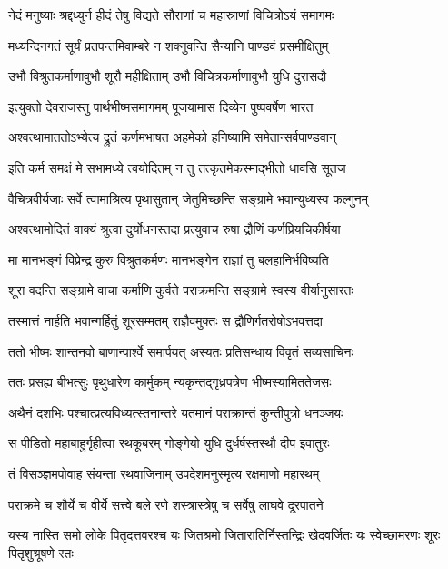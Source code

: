 \twolineshloka
{नेदं मनुष्याः श्रद्दध्युर्न हीदं तेषु विद्यते}
{सौराणां च महास्राणां विचित्रोऽयं समागमः}


\twolineshloka
{मध्यन्दिनगतं सूर्यं प्रतपन्तमिवाम्बरे}
{न शक्नुवन्ति सैन्यानि पाण्डवं प्रसमीक्षितुम्}


\twolineshloka
{उभौ विश्रुतकर्माणावुभौ शूरौ महीक्षिताम्}
{उभौ विचित्रकर्माणावुभौ युधि दुरासदौ}


\twolineshloka
{इत्युक्तो देवराजस्तु पार्थभीष्मसमागमम्}
{पूजयामास दिव्येन पुष्पवर्षेण भारत}


\twolineshloka
{अश्वत्थामाततोऽभ्येत्य द्रुतं कर्णमभाषत}
{अहमेको हनिष्यामि समेतान्सर्वपाण्डवान्}


\twolineshloka
{इति कर्म समक्षं मे सभामध्ये त्वयोदितम्}
{न तु तत्कृतमेकस्माद्भीतो धावसि सूतज}


\twolineshloka
{वैचित्रवीर्यजाः सर्वे त्वामाश्रित्य पृथासुतान्}
{जेतुमिच्छन्ति सङ्ग्रामे भवान्युध्यस्व फल्गुनम्}


\twolineshloka
{अश्वत्थामोदितं वाक्यं श्रुत्वा दुर्योधनस्तदा}
{प्रत्युवाच रुषा द्रौणिं कर्णप्रियचिकीर्षया}


\twolineshloka
{मा मानभङ्गं विप्रेन्द्र कुरु विश्रुतकर्मणः}
{मानभङ्गेन राज्ञां तु बलहानिर्भविष्यति}


\twolineshloka
{शूरा वदन्ति सङ्ग्रामे वाचा कर्माणि कुर्वते}
{पराक्रमन्ति सङ्ग्रामे स्वस्य वीर्यानुसारतः}


\twolineshloka
{तस्मात्तं नार्हति भवान्गर्हितुं शूरसम्मतम्}
{राज्ञैवमुक्तः स द्रौणिर्गतरोषोऽभवत्तदा}


\twolineshloka
{ततो भीष्मः शान्तनवो बाणान्पार्श्वे समार्पयत्}
{अस्यतः प्रतिसन्धाय विवृतं सव्यसाचिनः}


\twolineshloka
{ततः प्रसह्य बीभत्सुः पृथुधारेण कार्मुकम्}
{न्यकृन्तद्गृध्रपत्रेण भीष्मस्यामिततेजसः}


\twolineshloka
{अथैनं दशभिः पश्चात्प्रत्यविध्यत्स्तनान्तरे}
{यतमानं पराक्रान्तं कुन्तीपुत्रो धनञ्जयः}


\twolineshloka
{स पीडितो महाबाहुर्गृहीत्वा रथकूबरम्}
{गोङ्गेयो युधि दुर्धर्षस्तस्थौ दीप इवातुरः}


\twolineshloka
{तं विसञ्ज्ञमपोवाह संयन्ता रथवाजिनाम्}
{उपदेशमनुस्मृत्य रक्षमाणो महारथम्}


\twolineshloka
{पराक्रमे च शौर्ये च वीर्ये सत्त्वे बले रणे}
{शस्त्रास्त्रेषु च सर्वेषु लाघवे दूरपातने}


\threelineshloka
{यस्य नास्ति समो लोके पितृदत्तवरश्च यः}
{जितश्रमो जितारातिर्निस्तन्द्रिः खेदवर्जितः}
{यः स्वेच्छामरणः शूरः पितृशुश्रूषणे रतः}


